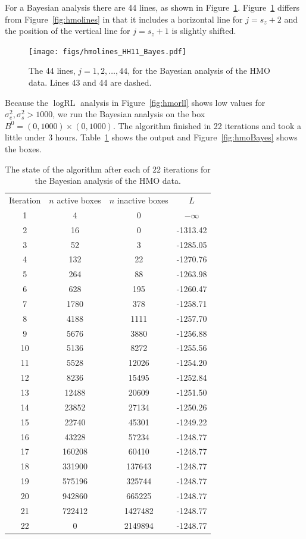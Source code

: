 \documentclass{report}
\newcommand{\RLorig}{\text{RL}}
\newcommand{\logRLorig}{\log\RLorig}
\newcommand{\sigssq}{\sigma_s^2}
\newcommand{\sigesq}{\sigma_e^2}
\begin{document}
For a Bayesian analysis there are 44 lines, as shown in Figure~\ref{fig:hmoBayeslines}.  Figure~\ref{fig:hmoBayeslines} differs from Figure~\ref{fig:hmolines} in that it includes a horizontal line for $j = s_z+2$ and the position of the vertical line for $j = s_z+1$ is slightly shifted.
\begin{figure}
	\centering
	\texttt{[image: figs/hmolines\_HH11\_Bayes.pdf]}
	\caption{The 44 lines, $j=1, 2, \dots, 44$, for the Bayesian analysis of the HMO data.
	              Lines 43 and 44 are dashed.}
	\label{fig:hmoBayeslines}
\end{figure}
Because the $\logRLorig$ analysis in Figure~\ref{fig:hmorll} shows low values for $\sigesq, \sigssq > 1000$, we run the Bayesian analysis on the box $B^0 = (0,1000) \times (0,1000)$.
The algorithm finished in 22 iterations and took a little under 3 hours.  Table~\ref{table:hmo_HH11Bayes} shows the output and Figure~\ref{fig:hmoBayes} shows the boxes.
\begin{table}[H]
\centering
\begin{tabular}{|c|c|c|c|}
\hline
Iteration & $n$ active boxes & $n$ inactive boxes & $L$\\
1 & 4 & 0 & $-\infty$\\
2 & 16 & 0 & -1313.42\\
3 & 52 & 3 & -1285.05\\
4 & 132 & 22 & -1270.76\\
5 & 264 & 88 & -1263.98\\
6 & 628 & 195 & -1260.47\\
7 & 1780 & 378 & -1258.71\\
8 & 4188 & 1111 & -1257.70\\
9 & 5676 & 3880 & -1256.88\\
10 & 5136 & 8272 & -1255.56\\
11 & 5528 & 12026 & -1254.20\\
12 & 8236 & 15495 & -1252.84\\
13 & 12488 & 20609 & -1251.50\\
14 & 23852 & 27134 & -1250.26\\
15 & 22740 & 45301 & -1249.22\\
16 & 43228 & 57234 & -1248.77\\
17 & 160208 & 60410 & -1248.77\\
18 & 331900 & 137643 & -1248.77\\
19 & 575196 & 325744 & -1248.77\\
20 & 942860 & 665225 & -1248.77\\
21 & 722412 & 1427482 & -1248.77\\
22 & 0 & 2149894 & -1248.77\\
\hline
\end{tabular}
\caption{The state of the algorithm after each of 22 iterations for the Bayesian analysis of the HMO data.}
\label{table:hmo_HH11Bayes}
\end{table}
\end{document}
